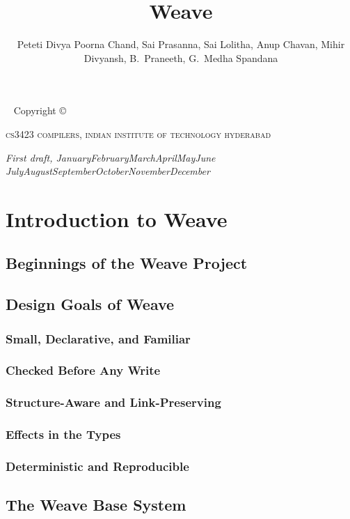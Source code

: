 \documentclass[nohyper,nobib]{tufte-book}
\title{Weave}
\author{Peteti Divya Poorna Chand, Sai Prasanna, Sai Lolitha, Anup Chavan, Mihir Divyansh, B.~Praneeth, G.~Medha Spandana}
\newcommand{\monthyear}{%
  \ifcase\month\or January\or February\or March\or April\or May\or June\or
  July\or August\or September\or October\or November\or December\fi
  \space\number\year}
\begin{document}
\frontmatter

\maketitle

\newpage
\begin{fullwidth}
~\vfill
\thispagestyle{empty}
\setlength{\parindent}{0pt}
\setlength{\parskip}{\baselineskip}
Copyright \copyright\ \the\year\ \thanklessauthor

\par\textsc{cs3423 compilers, indian institute of technology hyderabad}

\par\textit{First draft, \monthyear}
\end{fullwidth}

\tableofcontents

\mainmatter

\chapter{Introduction to Weave}
\section{Beginnings of the Weave Project}
\section{Design Goals of Weave}
\subsection{Small, Declarative, and Familiar}
\subsection{Checked Before Any Write}
\subsection{Structure-Aware and Link-Preserving}
\subsection{Effects in the Types}
\subsection{Deterministic and Reproducible}
\section{The Weave Base System}
\end{document}

